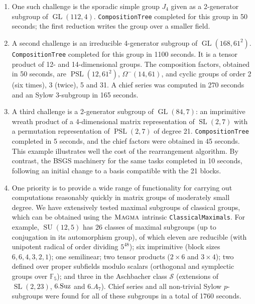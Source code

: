 \documentclass[12pt,twoside,reqno,psamsfonts]{amsproc}
\numberwithin{equation}{section}
\numberwithin{figure}{section}
\newcounter{algorithm}
\theoremstyle{plain}
\theoremstyle{definition}
\theoremstyle{remark}
\newcommand{\field}[1]{\mathbb{#1}}
\newcommand{\F}{\field{F}}
\newcommand{\MAGMA}{\textsc{Magma}}
\newcommand{\cS}{\mathcal{S}}
\DeclareMathOperator{\GL}{GL}
\DeclareMathOperator{\SL}{SL}
\DeclareMathOperator{\SU}{SU}
\DeclareMathOperator{\PSL}{PSL}
\begin{document}
\begin{enumerate}
\item 
One such challenge is the sporadic simple
group $J_4$ given as a 2-generator subgroup of $\GL(112,4)$.
{\tt CompositionTree} completed for this group in 50 seconds;
the first reduction writes the group over a smaller field.

\item 
A second challenge is an 
irreducible 4-generator subgroup of $\GL(168,61^2)$.
{\tt CompositionTree} completed for this group in 1100 seconds.
It is a tensor product of 12- and 14-dimensional groups. 
The composition factors,
obtained in 50 seconds, are
$\PSL(12,61^2)$, $\Omega^-(14,61)$, and cyclic groups of order 2 (six times),
3 (twice), 5 and 31. 
A chief series was computed in 270 seconds and 
an Sylow 3-subgroup in 165 seconds.

\item 
A third challenge is a 2-generator subgroup of
$\GL(84,7)$: an imprimitive wreath product of a
4-dimensional matrix representation of $\SL(2,7)$ with a permutation
representation of $\PSL(2,7)$ of degree 21.
{\tt CompositionTree} completed in 5 seconds, and the chief factors
were obtained in 45 seconds. This example illustrates well the 
cost of the rearrangement algorithm. 
By contrast, the BSGS machinery for the same tasks
completed in 10 seconds, following an initial 
change to a basis compatible with the 21 blocks.

\item 
One priority 
is to provide a wide range of functionality for carrying out
computations reasonably quickly in matrix groups of moderately small degree.
We have extensively tested maximal subgroups of classical groups,
which can be obtained using the $\MAGMA$ intrinsic {\tt ClassicalMaximals}.
For example, $\SU(12,5)$ has 26 classes of maximal subgroups
(up to conjugation in its automorphism group), of which eleven are reducible
(with unipotent radical of order dividing $5^{48}$);
six imprimitive (block sizes $6,6,4,3,2,1$); one semilinear;
two tensor products ($2 \times 6$ and $3 \times 4$); two defined over
proper subfields modulo scalars (orthogonal and symplectic groups over $\F_5$);
and three in the Aschbacher class $\cS$
(extensions of $\SL(2,23)$, $6.{\rm Suz}$ and $6. A_7$).
Chief series and all non-trivial Sylow $p$-subgroups were found
for all of these subgroups in a total of 1760 seconds.


\end{enumerate}
\end{document}
